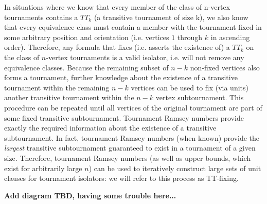 \documentclass[conference]{IEEEtran}
\begin{document}
In situations where we know that every member of the class of n-vertex tournaments contains a $TT_k$ (a transitive tournament of size k), we also know that every equivalence class must contain a member with the tournament fixed in some arbitrary position and orientation (i.e. vertices $1$ through $k$ in ascending order). Therefore, any formula that fixes (i.e. asserts the existence of) a $TT_k$ on the class of $n$-vertex tournaments is a valid isolator, i.e. will not remove any equivalence classes. Because the remaining subset of $n-k$ non-fixed vertices also forms a tournament, further knowledge about the existence of a transitive tournament within the remaining $n-k$ vertices can be used to fix (via units) another transitive tournament within the $n-k$ vertex subtournament. This procedure can be repeated until all vertices of the original tournament are part of some fixed transitive subtournament. Tournament Ramsey numbers provide exactly the required information about the existence of a transitive subtournament. In fact, tournament Ramsey numbers (when known) provide the \textit{largest} transitive subtournament guaranteed to exist in a tournament of a given size. Therefore, tournament Ramsey numbers (as well as upper bounds, which exist for arbitrarily large $n$) can be used to iteratively construct large sets of unit clauses for tournament isolators: we will refer to this process as TT-fixing.

\textbf{Add diagram TBD, having some trouble here...}
\end{document}
